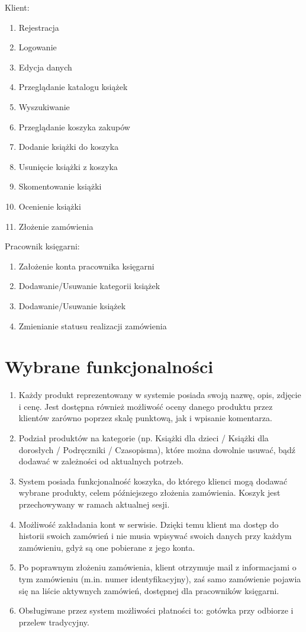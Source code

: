 \documentclass[pdflatex,11pt]{aghdpl}
\begin{document}
Klient:
\begin{enumerate}
\item        Rejestracja
\item        Logowanie
\item        Edycja danych
\item        Przeglądanie katalogu książek
\item        Wyszukiwanie
\item        Przeglądanie koszyka zakupów
\item        Dodanie książki do koszyka
\item        Usunięcie książki z koszyka
\item        Skomentowanie książki
\item        Ocenienie książki
\item        Złożenie zamówienia
\end{enumerate}

Pracownik księgarni:
\begin{enumerate}
\item        Założenie konta pracownika księgarni
\item        Dodawanie/Usuwanie kategorii książek
\item        Dodawanie/Usuwanie książek
\item        Zmienianie statusu realizacji zamówienia
\end{enumerate}


\section{Wybrane funkcjonalności}

\begin{enumerate}
\item Każdy produkt reprezentowany w systemie posiada swoją nazwę, opis, zdjęcie i cenę. Jest dostępna również możliwość oceny danego produktu przez klientów zarówno poprzez skalę punktową, jak i wpisanie komentarza.
\item Podział produktów na kategorie (np. Książki dla dzieci / Książki dla dorosłych / Podręczniki / Czasopisma), które można dowolnie usuwać, bądź dodawać w zależności od aktualnych potrzeb.
\item System posiada funkcjonalność koszyka, do którego klienci mogą dodawać wybrane produkty, celem późniejszego złożenia zamówienia. Koszyk jest przechowywany w ramach aktualnej sesji.
\item Możliwość zakładania kont w serwisie. Dzięki temu klient ma dostęp do historii swoich zamówień i nie musia wpisywać swoich danych przy każdym zamówieniu, gdyż są one pobierane z jego konta.
\item Po poprawnym złożeniu zamówienia, klient otrzymuje mail z informacjami o tym zamówieniu (m.in. numer identyfikacyjny), zaś samo zamówienie pojawia się na liście aktywnych zamówień, dostępnej dla pracowników księgarni.
\item Obsługiwane przez system możliwości płatności to: gotówka przy odbiorze i przelew tradycyjny.
\end{enumerate}
\end{document}
